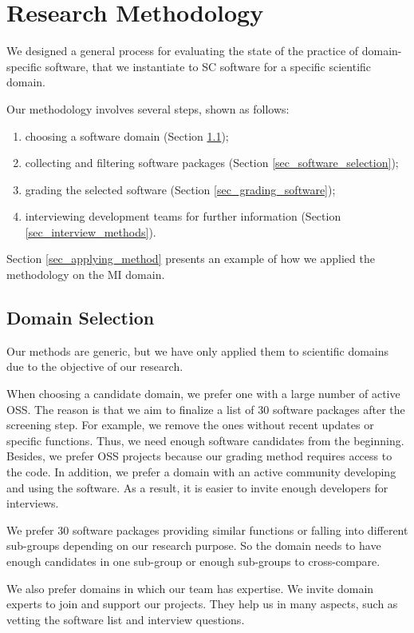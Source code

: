 \chapter{Research Methodology}
\label{ch_methods}

We designed a general process for evaluating the state of the practice of domain-specific software, that we instantiate to SC software for a specific scientific domain.

Our methodology involves several steps, shown as follows:
\begin{enumerate}
\item choosing a software domain (Section \ref{sec_domain_selection});
\item collecting and filtering software packages (Section \ref{sec_software_selection});
\item grading the selected software (Section \ref{sec_grading_software});
\item interviewing development teams for further information (Section \ref{sec_interview_methods}).
\end{enumerate}

Section \ref{sec_applying_method} presents an example of how we applied the methodology on the MI domain.

\section{Domain Selection}
\label{sec_domain_selection}
Our methods are generic, but we have only applied them to scientific domains due to the objective of our research.

When choosing a candidate domain, we prefer one with a large number of active OSS. The reason is that we aim to finalize a list of 30 software packages \cite{SmithEtAl2021} after the screening step. For example, we remove the ones without recent updates or specific functions. Thus, we need enough software candidates from the beginning. Besides, we prefer OSS projects because our grading method requires access to the code. In addition, we prefer a domain with an active community developing and using the software. As a result, it is easier to invite enough developers for interviews.

We prefer 30 software packages providing similar functions or falling into different sub-groups depending on our research purpose. So the domain needs to have enough candidates in one sub-group or enough sub-groups to cross-compare.

We also prefer domains in which our team has expertise. We invite domain experts to join and support our projects. They help us in many aspects, such as vetting the software list and interview questions.

